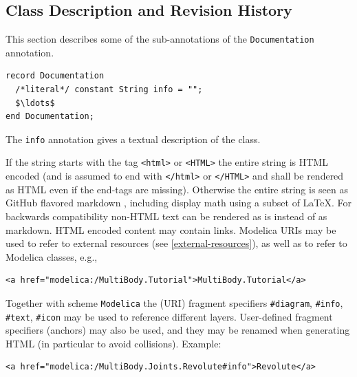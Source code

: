 \subsection{Class Description and Revision History}\label{annotation-info-revisions}

This section describes some of the sub-annotations of the \lstinline!Documentation! annotation.

\begin{annotationdefinition*}[info]\label{modelica:Documentation.info}
\begin{synopsis}\begin{lstlisting}
record Documentation
  /*literal*/ constant String info = "";
  $\ldots$
end Documentation;
\end{lstlisting}\end{synopsis}
\begin{semantics}
The \lstinline!info! annotation gives a textual description of the class.

If the string starts with the tag \lstinline!<html>! or \lstinline!<HTML>! the entire string is HTML encoded (and is assumed to end with \lstinline!</html>! or \lstinline!</HTML>! and shall be rendered as HTML even if the end-tags are missing).
Otherwise the entire string is seen as GitHub flavored markdown \textcite{GitHubFlavoredMarkdown}, including display math using a subset of \LaTeX.
For backwards compatibility non-HTML text can be rendered as is instead of as markdown.
HTML encoded content may contain links.
Modelica URIs may be used to refer to external resources (see \cref{external-resources}), as well as to refer to Modelica classes, e.g.,
\begin{lstlisting}[language=modelica]
<a href="modelica:/MultiBody.Tutorial">MultiBody.Tutorial</a>
\end{lstlisting}

Together with scheme \lstinline!Modelica! the (URI) fragment specifiers \lstinline!#diagram!, \lstinline!#info!, \lstinline!#text!, \lstinline!#icon! may be used to reference different layers.
User-defined fragment specifiers (anchors) may also be used, and they may be renamed when generating HTML (in particular to avoid collisions).
Example:
\begin{lstlisting}[language=modelica]
<a href="modelica:/MultiBody.Joints.Revolute#info">Revolute</a>
\end{lstlisting}
\end{semantics}
\end{annotationdefinition*}

